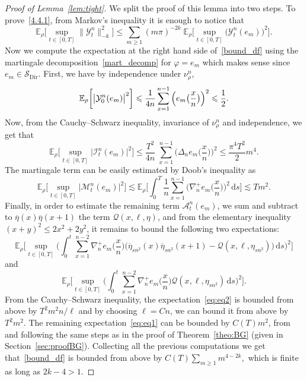 \documentclass[AHL,Unicode,longabstracts]{cedram}
\DeclareMathOperator{\Dir}{Dir}
\newcommand{\mc}[1]{{\mathcal #1}}
\renewcommand{\mc}[1]{{\mathcal #1}}
\newcommand{\SD}{\ensuremath{\mc S_{\Dir}}}
\newcommand{\pfrac}[2]{\genfrac{}{}{}{1}{#1}{#2}}
\renewcommand{\bar}{\overline}
\renewcommand{\leq}{\leqslant}
\renewcommand{\le}{\leqslant}
\renewcommand{\geq}{\geqslant}
\newcommand*{\dd}{\mathrm{d}}
\newcommand*{\ds}{\dd s}
\renewcommand{\pfrac}{\frac}
\begin{document}
\begin{proof}[Proof of Lemma~\ref{lem:tight}]
We split the proof of this lemma into two steps. To prove~\eqref{4.4.1}, from Markov's inequality it is enough to notice that
\begin{equation}\label{bound_df}
\mathbb{E}_{\rho}\bigg[\sup_{t\in[0,T]}\|{{\mathcal{Y}}}^n_{t}\|_{-k}^{2}\bigg] \le
\sum_{m\geq 1}(m\pi)^{-2k}\; \mathbb{E}_{\rho}\bigg[\sup_{t\in[0,T]}\big(\mathcal{Y}^n_{t}(e_m)\big)^{2}\bigg].
\end{equation}
Now we compute the expectation at the right hand side of~\eqref{bound_df} using the martingale decomposition~\eqref{mart_decomp} for $\varphi=e_m$ which makes sense since $e_m\in\SD$. First, we have by independence under $\nu^n_\rho$,
\begin{equation}\label{initialtime}
\mathbb{E}_{\rho}\bigg[\big|{\mathcal Y}_{0}^{n}(e_m)\big|^2\bigg]\\
\leq \frac{1}{4n}\sum_{x=1}^{n-1}\Big(e_m\big(\pfrac x n\big)\Big)^2\leq \frac 1 2.
\end{equation}
Now, from the Cauchy--Schwarz inequality, invariance of $\nu^n_\rho$ and independence, we get that
\begin{equation}\label{boundintj}
\mathbb{E}_{\rho}\bigg[\sup_{t\in[0,T]}\big|\mathcal{I}_t^n(e_m)\big|^2\bigg]
\leq
\frac{T^2}{4n}\; \sum_{x=1}^{n-1}\Big(\Delta_ne_m\Big(\pfrac x n\Big)\Big)^2\leq \frac{\pi^4T^2}{2} m^4.
\end{equation}
The martingale term can be easily estimated by Doob's inequality as
\begin{equation*}
\mathbb{E}_{\rho}\bigg[\sup_{t\in[0,T]}\big|\mathcal{M}_{t}^n(e_m)\big|^{2}\bigg]\lesssim \mathbb{E}_{\rho}\bigg[\int_0^T\frac{1}{n}\sum_{x=1}^{n-1}\Big(\nabla_n^+ e_m\Big(\pfrac x n\Big)\Big)^2\,\ds\bigg]\lesssim Tm^2.
\end{equation*}
Finally, in order to estimate the remaining term $\mc A_t^n(e_m)$, we sum and subtract to $\bar\eta(x)\bar\eta(x+1)$ the term $\mathcal {Q}(x,\ell,\eta)$, and from the elementary inequality $(x+y)^2\leq 2x^2+2y^2$, it remains to bound the following two expectations:
\begin{equation}\label{eq:eq1}
\mathbb{E}_{\rho}\bigg[\sup_{t\in[0,T]}\bigg(\int_{0}^t\sum_{x=1}^{n-2}\nabla_n^+ e_m\Big(\pfrac x n \Big)\big(\bar\eta_{sn^2}(x)\bar\eta_{sn^2}(x+1)-\mathcal{Q}(x,\ell,\eta_{sn^2})\big)\, \ds\bigg)^2\bigg]
\end{equation}
and
\begin{equation}\label{eq:eq2}
\mathbb{E}_{\rho}\bigg[\sup_{t\in[0,T]}\bigg(\int_{0}^t\sum_{x=1}^{n-2}\nabla_n^+ e_m\Big(\pfrac x n \Big)\mathcal{Q}(x,\ell,\eta_{sn^2})\, \ds
\bigg)^2\bigg].
\end{equation}
From the Cauchy--Schwarz inequality, the expectation~\eqref{eq:eq2} is bounded from above by $T^2m^2n/\ell$ and by choosing $\ell=Cn$, we can bound it from above by $T^2m^2$. The remaining expectation~\eqref{eq:eq1} can be bounded by $C(T)m^2$, from~\cite[Lemma~4.3]{CLO} and following the same steps as in the proof of Theorem~\ref{theo:BG} (given in Section~\ref{sec:proofBG}). Collecting all the previous computations we get that~\eqref{bound_df} is bounded from above by $C(T)\sum_{m\geq1}{m}^{4-2k},$ which is finite as long as $2k-4>1$.


\end{proof}
\end{document}
